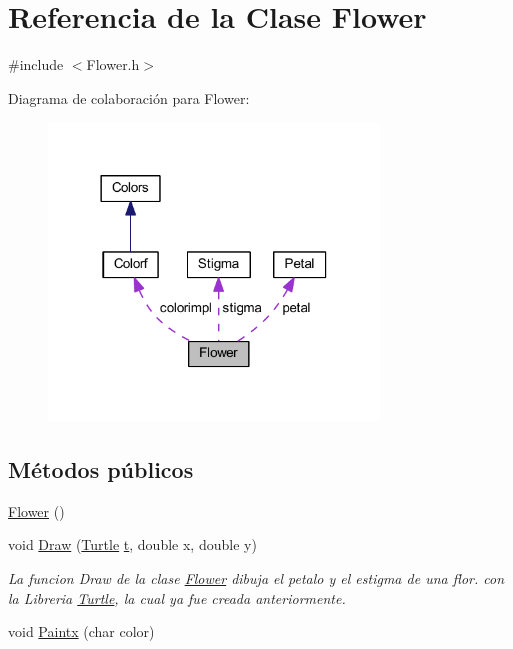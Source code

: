\hypertarget{class_flower}{}\section{Referencia de la Clase Flower}
\label{class_flower}


{\ttfamily \#include $<$Flower.\+h$>$}



Diagrama de colaboración para Flower\+:
\nopagebreak
\begin{figure}[H]
\begin{center}
\leavevmode
\includegraphics[width=249pt]{class_flower__coll__graph}
\end{center}
\end{figure}
\subsection*{Métodos públicos}
\begin{DoxyCompactItemize}
\item 
\mbox{\hyperlink{class_flower_a24f3f77559b3a76509febf7392413ff7}{Flower}} ()
\item 
void \mbox{\hyperlink{class_flower_aa25ad2aeb15804fa1f7bc0064ae0e8f1}{Draw}} (\mbox{\hyperlink{class_turtle}{Turtle}} \mbox{\hyperlink{_abstract_8cpp_a87833ae07d42f160626b6355cd9f8cf0}{t}}, double x, double y)
\begin{DoxyCompactList}\small\item\em La funcion Draw de la clase \mbox{\hyperlink{class_flower}{Flower}} dibuja el petalo y el estigma de una flor. con la Libreria \mbox{\hyperlink{class_turtle}{Turtle}}, la cual ya fue creada anteriormente. \end{DoxyCompactList}\item 
void \mbox{\hyperlink{class_flower_a63947d23866ea55e132c1744caf63b19}{Paintx}} (char color)
\end{DoxyCompactItemize}
